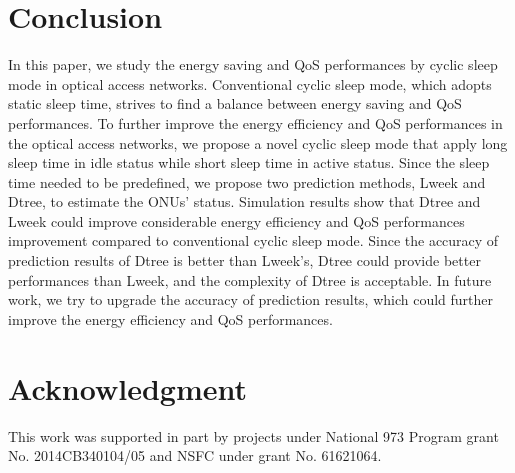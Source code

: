 \documentclass[journal]{IEEEtran}
\begin{document}
\section{Conclusion}
In this paper, we study the energy saving and QoS performances by cyclic sleep mode in optical access networks. Conventional cyclic sleep mode, which adopts static sleep time, strives to find a balance between energy saving and QoS performances. To further improve the energy efficiency and QoS performances in the optical access networks, we propose a novel cyclic sleep mode that apply long sleep time in idle status while short sleep time in active status. Since the sleep time needed to be predefined, we propose two prediction methods, Lweek and Dtree, to estimate the ONUs' status. Simulation results show that Dtree and Lweek could improve considerable energy efficiency and QoS performances improvement compared to conventional cyclic sleep mode. Since the accuracy of prediction results of Dtree is better than Lweek's, Dtree could provide better performances than Lweek, and the complexity of Dtree is acceptable. In future work, we try to upgrade the accuracy of prediction results, which could further improve the energy efficiency and QoS performances.


\section*{Acknowledgment}
This work was supported in part by projects under National 973 Program grant No. 2014CB340104/05 and NSFC under grant No. 61621064.



\end{document}
